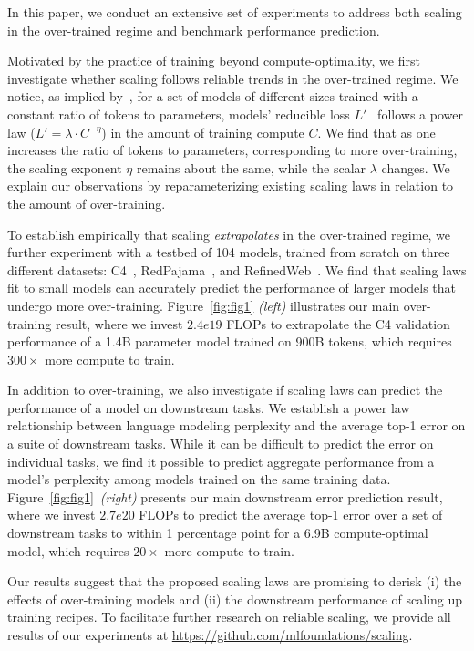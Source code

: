 \documentclass[dvipsnames,11pt]{article}
\begin{document}
In this paper, we conduct an extensive set of experiments to address both scaling in the over-trained regime and benchmark performance prediction.

Motivated by the practice of training beyond compute-optimality, we first investigate whether scaling follows reliable trends in the over-trained regime.
We notice, as implied by~\citet{chinchilla}, for a set of models of different sizes trained with a constant ratio of tokens to parameters, models' reducible loss $L'$~\cite{og_scaling,chinchilla} follows a power law ($L' = \lambda \cdot C^{-\eta}$) in the amount of training compute $C$.
We find that as one increases the ratio of tokens to parameters, corresponding to more over-training, the scaling exponent $\eta$ remains about the same, while the scalar $\lambda$ changes. We explain our observations by reparameterizing existing scaling laws in relation to the amount of over-training.

To establish empirically that scaling \emph{extrapolates} in the over-trained regime, we further experiment with a testbed of 104 models, trained from scratch on three different datasets: C4~\cite{c4,c4_ai2}, RedPajama~\cite{rpj}, and RefinedWeb~\cite{refinedweb}. 
We find that scaling laws fit to small models can accurately predict the performance of larger models that undergo more over-training.
Figure~\ref{fig:fig1} \emph{(left)} illustrates our main over-training result, where we invest $2.4e19$ FLOPs to extrapolate the C4 validation performance of a 1.4B parameter model trained on 900B tokens, which requires $300\times$ more compute to train.

In addition to over-training, we also investigate if scaling laws can predict the performance of a model on downstream tasks.
We establish a power law relationship between language modeling perplexity and the average top-1 error on a suite of downstream tasks.
While it can be difficult to predict the error on individual tasks, we find it possible to predict aggregate performance from a model's perplexity among models trained on the same training data.
Figure~\ref{fig:fig1}~\emph{(right)} presents our main downstream error prediction result, where we invest $2.7e20$ FLOPs to predict the average top-1 error over a set of downstream tasks to within 1 percentage point for a 6.9B compute-optimal model, which requires $20\times$ more compute to train.

Our results suggest that the proposed scaling laws are promising to derisk (i) the effects of over-training models and (ii) the downstream performance of scaling up training recipes.
To facilitate further research on reliable scaling, we provide all results of our experiments at \url{https://github.com/mlfoundations/scaling}.
\end{document}
